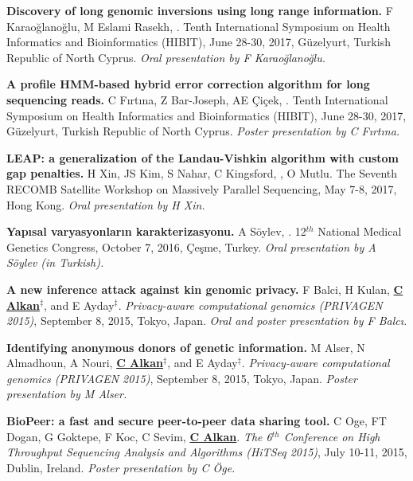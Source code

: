 \clearpage

\vspace{-.2cm}
       {\bf Discovery of long genomic inversions using long range information.} F Karaoğlanoğlu, M Eslami Rasekh, \calkan{}.
       Tenth International Symposium on Health Informatics and Bioinformatics (HIBIT), June 28-30, 2017, Güzelyurt, Turkish Republic of North Cyprus.
       {\it Oral presentation by F Karaoğlanoğlu.}

\vspace{-.2cm}
       {\bf A profile HMM-based hybrid error correction algorithm for long sequencing reads.} C Fırtına, Z Bar-Joseph, AE Çiçek, \calkan{}.
       Tenth International Symposium on Health Informatics and Bioinformatics (HIBIT), June 28-30, 2017, Güzelyurt, Turkish Republic of North Cyprus.
       {\it Poster presentation by C Fırtına.}

\vspace{-.2cm}
       {\bf LEAP: a generalization of the Landau-Vishkin algorithm with custom gap penalties.} H Xin, JS Kim, S Nahar, C Kingsford, \calkan{}, O Mutlu.
       The Seventh RECOMB Satellite Workshop on Massively Parallel Sequencing, May 7-8, 2017, Hong Kong.
       {\it Oral presentation by H Xin.}

\vspace{-.2cm}
       {\bf Yapısal varyasyonların karakterizasyonu.} A Söylev, \calkan{}. 12$^{th}$ National Medical Genetics Congress, October 7, 2016, Çeşme, Turkey.
       {\it Oral presentation by A Söylev (in Turkish).}
       
\vspace{-.2cm}
{\bf  A new inference attack against kin genomic privacy.}
F Balci, H Kulan, {\bf {\underline{C Alkan}}}$^\ddag$, and E Ayday$^\ddag$. 
{\em Privacy-aware computational genomics (PRIVAGEN 2015)}, 
 September 8, 2015, Tokyo, Japan. {\it Oral and poster presentation by F Balcı.}

 \vspace{-.2cm}
{\bf Identifying anonymous donors of genetic information.}
M Alser, N Almadhoun, A Nouri, {\bf {\underline{C Alkan}}}$^\ddag$, and E Ayday$^\ddag$. 
{\em Privacy-aware computational genomics (PRIVAGEN 2015)}, 
 September 8, 2015, Tokyo, Japan. {\it Poster presentation by M Alser.}


\vspace{-.2cm}
 {\bf BioPeer: a fast and secure peer-to-peer data sharing tool.}
  C Oge, FT Dogan, G Goktepe, F Koc, C Sevim, {\bf {\underline{C Alkan}}}.
{\em The 6$^{th}$ Conference on High Throughput Sequencing Analysis and Algorithms (HiTSeq 2015)}, 
July 10-11, 2015, Dublin, Ireland. {\it Poster presentation by C Öge.}

